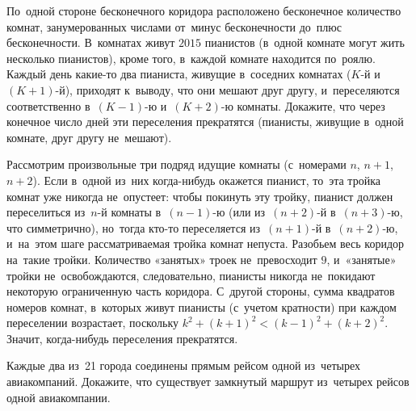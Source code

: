\begin{problems}

\item
По~одной стороне бесконечного коридора расположено бесконечное количество
комнат, занумерованных числами от~минус бесконечности до~плюс бесконечности.
В~комнатах живут $2015$ пианистов (в~одной комнате могут жить несколько
пианистов), кроме того, в~каждой комнате находится по~роялю.
Каждый день какие-то два пианиста, живущие в~соседних комнатах
($K$-й и~$(K + 1)$-й), приходят к~выводу, что они мешают друг другу,
и~переселяются соответственно в~$(K - 1)$-ю и~$(K + 2)$-ю комнаты.
Докажите, что через конечное число дней эти переселения прекратятся
(пианисты, живущие в~одной комнате, друг другу не~мешают).

\end{problems}

\ifincludesolutions
Рассмотрим произвольные три подряд идущие комнаты
(с~номерами $n$, $n + 1$, $n + 2$).
Если в~одной из~них когда-нибудь окажется пианист, то~эта тройка комнат уже
никогда не~опустеет: чтобы покинуть эту тройку, пианист должен переселиться
из~$n$-й комнаты в~$(n - 1)$-ю (или из~$(n + 2)$-й в~$(n + 3)$-ю, что
симметрично), но~тогда кто-то переселяется из~$(n + 1)$-й в~$(n + 2)$-ю,
и~на~этом шаге рассматриваемая тройка комнат непуста.
Разобьем весь коридор на~такие тройки.
Количество «занятых» троек не~превосходит $9$, и~«занятые» тройки
не~освобождаются, следовательно, пианисты никогда не~покидают некоторую
ограниченную часть коридора.
С~другой стороны, сумма квадратов номеров комнат, в~которых живут пианисты
(с~учетом кратности) при каждом переселении возрастает, поскольку
$k^2 + (k + 1)^2 < (k - 1)^2 + (k + 2)^2$.
Значит, когда-нибудь переселения прекратятся.
\fi %

\begin{problems}

\item
Каждые два из~21 города соединены прямым рейсом одной из~четырех авиакомпаний.
Докажите, что существует замкнутый маршрут из~четырех рейсов одной
авиакомпании.

\end{problems}

